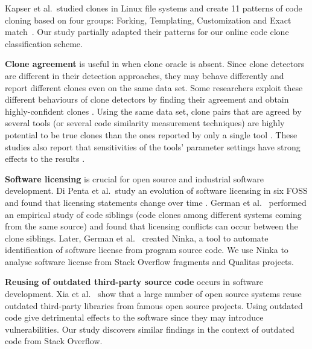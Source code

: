 \documentclass{sig-alternate-05-2015}
\begin{document}
Kapser et al.~studied clones in Linux file systems and create 11 patterns of code cloning based on four groups: Forking, Templating, Customization and Exact match~\cite{Kapser2003,Kapser2008}. Our study partially adapted their patterns for our online code clone classification scheme.

\textbf{Clone agreement} is useful in when clone oracle is absent. Since clone detectors are different in their detection approaches, they may behave differently and report different clones even on the same data set. Some researchers exploit these different behaviours of clone detectors by finding their agreement and obtain highly-confident clones \cite{Bellon2007,Wang2013}. Using the same data set, clone pairs that are agreed by several tools (or several code similarity measurement techniques) are highly potential to be true clones than the ones reported by only a single tool \cite{Wang2013,cr2016ssbse,Funaro2010}. These studies also report that sensitivities of the tools' parameter settings have strong effects to the results \cite{Wang2013,cr2016ssbse}.

\textbf{Software licensing} is crucial for open source and industrial software development. Di Penta et al.~study an evolution of software licensing in six FOSS and found that licensing statements change over time \cite{DiPenta2010}. German et al.~\cite{German2009} performed an empirical study of code siblings (code clones among different systems coming from the same source) and found that licensing conflicts can occur between the clone siblings. Later, German et al.~\cite{German2010} created Ninka, a tool to automate identification of software license from program source code. We use Ninka to analyse software license from Stack Overflow fragments and Qualitas projects. 

\textbf{Reusing of outdated third-party source code} occurs in software development. Xia et al.~\cite{Xia2014} show that a large number of open source systems reuse outdated third-party libraries from famous open source projects. Using outdated code give detrimental effects to the software since they may introduce vulnerabilities. Our study discovers similar findings in the context of outdated code from Stack Overflow.
\end{document}
